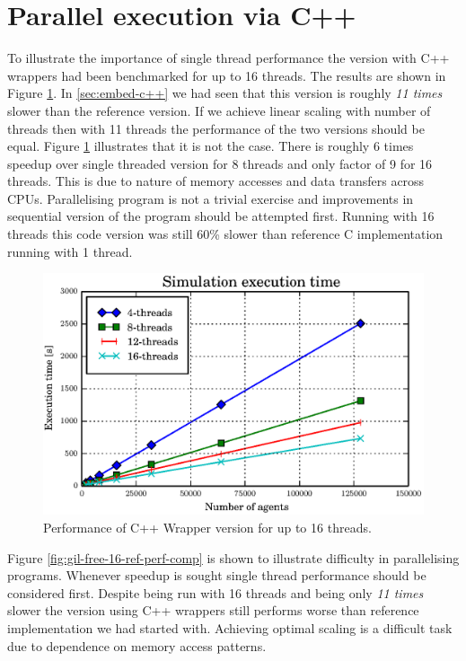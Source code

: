 \documentclass[12pt, a4paper]{report}
\begin{document}
\section{Parallel execution via C++}\label{sec:para-c++}
To illustrate the importance of single thread performance the version with C++ wrappers
had been benchmarked for up to 16 threads. The results are shown in Figure \ref{fig:gil-free-multi-16-perf}.
In \ref{sec:embed-c++} we had seen that this version is roughly \emph{11 times} slower
than the reference version. If we achieve linear scaling with number of threads
then with 11 threads the performance of the two versions should be equal. Figure
\ref{fig:gil-free-multi-16-perf} illustrates that it is not the case. There is roughly
6 times speedup over single threaded version for 8 threads and only factor of 9 for 16
threads. This is due to nature of memory accesses and data transfers across CPUs.
Parallelising program is not a trivial exercise and improvements in sequential version
of the program should be attempted first. Running with 16 threads this code version was
still 60\% slower than reference C implementation running with 1 thread.

\begin{figure}[H]
  \begin{center}
    \includegraphics[width=\columnwidth]{graphs/gil-free-multi-16-perf.eps}
    \caption{Performance of C++ Wrapper version for up to 16 threads.}
    \label{fig:gil-free-multi-16-perf}
  \end{center}
\end{figure}

Figure \ref{fig:gil-free-16-ref-perf-comp} is shown to illustrate difficulty in
parallelising programs. Whenever speedup is sought single thread performance
should be considered first. Despite being run with 16 threads and being only
\emph{11 times} slower the version using C++ wrappers still performs worse
than reference implementation we had started with. Achieving optimal scaling
is a difficult task due to dependence on memory access patterns.
\end{document}
